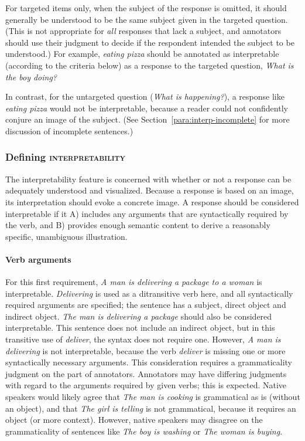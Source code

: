 \documentclass[12pt]{article}
\newcommand{\feat}[1]{\textsc{#1}}
\begin{document}
For targeted items only, when the subject of the response is omitted, it should generally be understood to be the same subject given in the targeted question. (This is not appropriate for \textit{all} responses that lack a subject, and annotators should use their judgment to decide if the respondent intended the subject to be understood.) For example, \textit{eating pizza} should be annotated as interpretable (according to the criteria below) as a response to the targeted question, \textit{What is the boy doing?}

In contrast, for the untargeted question (\textit{What is happening?}), a response like \textit{eating pizza} would not be interpretable, because a reader could not confidently conjure an image of the subject. (See Section~\ref{para:interp-incomplete} for more discussion of incomplete sentences.)

\subsubsection{Defining \feat{interpretability}} The interpretability feature is concerned with whether or not a response can be adequately understood and visualized. Because a response is based on an image, its interpretation should evoke a concrete image. A response should be considered interpretable if it A) includes any arguments that are syntactically required by the verb, and B) provides enough semantic content to derive a reasonably specific, unambiguous illustration.

\paragraph{Verb arguments} \label{para:interp-arguments} For this first requirement, \textit{A man is delivering a package to a woman} is interpretable. \textit{Delivering} is used as a ditransitive verb here, and all syntactically required arguments are specified; the sentence has a subject, direct object and indirect object. \textit{The man is delivering a package} should also be considered interpretable. This sentence does not include an indirect object, but in this transitive use of \textit{deliver}, the syntax does not require one. However, \textit{A man is delivering} is not interpretable, because the verb \textit{deliver} is missing one or more syntactically necessary arguments. This consideration requires a grammaticality judgment on the part of annotators. Annotators may have differing judgments with regard to the arguments required by given verbs; this is expected. Native speakers would likely agree that \textit{The man is cooking} is grammatical as is (without an object), and that \textit{The girl is telling} is not grammatical, because it requires an object (or more context). However, native speakers may disagree on the grammaticality of sentences like \textit{The boy is washing} or \textit{The woman is buying}.
\end{document}
